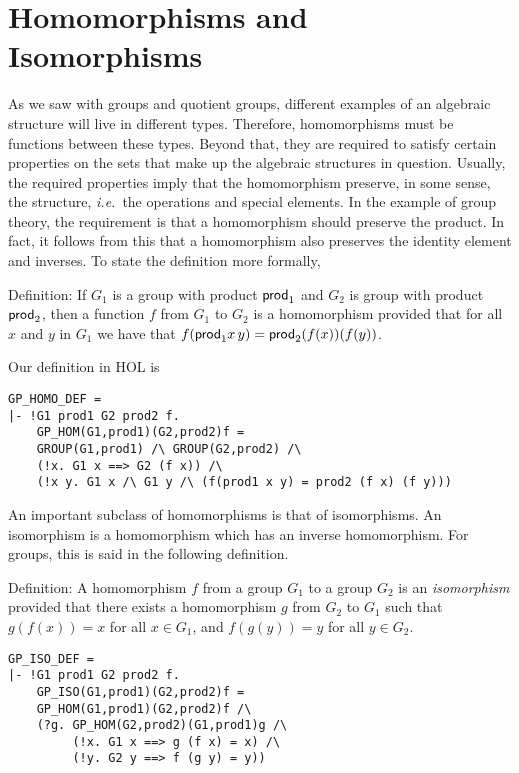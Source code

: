 \section{Homomorphisms and Isomorphisms}

As we saw with groups and quotient groups, different examples of an
algebraic structure will live in different types.  Therefore,
homomorphisms must be functions between these types.  Beyond that,
they are required to satisfy certain properties on the sets that make
up the algebraic structures in question.  Usually, the required
properties imply that the homomorphism preserve, in some sense, the
structure, {\it i.e.}~the operations and special elements.  In the
example of group theory, the requirement is that a homomorphism should
preserve the product.  In fact, it follows from this that a
homomorphism also preserves the identity element and inverses.  To
state the definition more formally,
\begin{display}{Definition:}
If $G_1$ is a group with product ${\sf prod}_1$ and $G_2$ is group
with product ${\sf prod}_2$, then a function $f$ from $G_1$ to $G_2$
is a homomorphism provided that for all $x$ and $y$ in $G_1$ we have
that $f({\sf prod}_1 x\,y) = {\sf prod}_2(f(x))(f(y))$.
\end{display}
Our definition in HOL is
\begin{verbatim}
GP_HOMO_DEF =
|- !G1 prod1 G2 prod2 f.
    GP_HOM(G1,prod1)(G2,prod2)f =
    GROUP(G1,prod1) /\ GROUP(G2,prod2) /\
    (!x. G1 x ==> G2 (f x)) /\
    (!x y. G1 x /\ G1 y /\ (f(prod1 x y) = prod2 (f x) (f y)))
\end{verbatim}

An important subclass of homomorphisms is that of isomorphisms.  An
isomorphism is a homomorphism which has an inverse homomorphism.  For
groups, this is said in the following definition.
\begin{display}{Definition:}
A homomorphism $f$ from a group $G_1$ to a group $G_2$ is an
{\it isomorphism\/} provided that there exists a homomorphism $g$ from
$G_2$ to $G_1$ such that $g(f(x))=x$ for all $x\in G_1$, and
$f(g(y))=y$ for all $y\in G_2$.
\end{display}
\begin{verbatim}
GP_ISO_DEF =
|- !G1 prod1 G2 prod2 f.
    GP_ISO(G1,prod1)(G2,prod2)f =
    GP_HOM(G1,prod1)(G2,prod2)f /\
    (?g. GP_HOM(G2,prod2)(G1,prod1)g /\
         (!x. G1 x ==> g (f x) = x) /\
         (!y. G2 y ==> f (g y) = y))
\end{verbatim}

